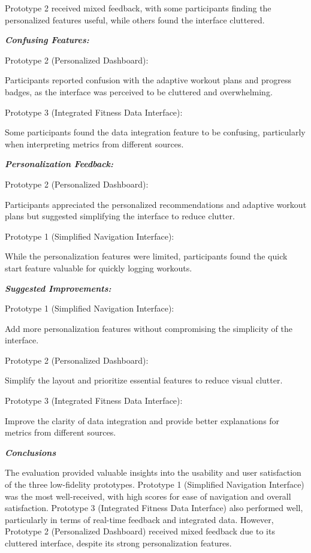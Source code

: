 \documentclass[
	letterpaper, %
]{jdf}
\begin{document}
Prototype 2 received mixed feedback, with some participants finding the personalized features useful, while others found the interface cluttered.

\textbf{\textit{Confusing Features:
}}
 

Prototype 2 (Personalized Dashboard):

Participants reported confusion with the adaptive workout plans and progress badges, as the interface was perceived to be cluttered and overwhelming.

Prototype 3 (Integrated Fitness Data Interface):

Some participants found the data integration feature to be confusing, particularly when interpreting metrics from different sources.

\textbf{\textit{Personalization Feedback:
}}
 

Prototype 2 (Personalized Dashboard):

Participants appreciated the personalized recommendations and adaptive workout plans but suggested simplifying the interface to reduce clutter.

Prototype 1 (Simplified Navigation Interface):

While the personalization features were limited, participants found the quick start feature valuable for quickly logging workouts.

\textbf{\textit{Suggested Improvements:
}}
 

Prototype 1 (Simplified Navigation Interface):

Add more personalization features without compromising the simplicity of the interface.

Prototype 2 (Personalized Dashboard):

Simplify the layout and prioritize essential features to reduce visual clutter.

Prototype 3 (Integrated Fitness Data Interface):

Improve the clarity of data integration and provide better explanations for metrics from different sources.

\textbf{\textit{Conclusions}}

The evaluation provided valuable insights into the usability and user satisfaction of the three low-fidelity prototypes. Prototype 1 (Simplified Navigation Interface) was the most well-received, with high scores for ease of navigation and overall satisfaction. Prototype 3 (Integrated Fitness Data Interface) also performed well, particularly in terms of real-time feedback and integrated data. However, Prototype 2 (Personalized Dashboard) received mixed feedback due to its cluttered interface, despite its strong personalization features.
\end{document}
